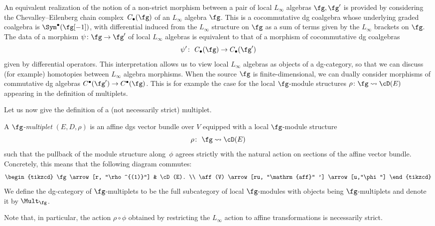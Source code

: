 \begin{rmk}
	An equivalent realization of the notion of a non-strict morphism between a pair of local $L_\infty$ algebras $\fg,\fg'$ is provided by considering the Chevalley--Eilenberg chain complex~$C_\bullet(\fg)$ of an $L_\infty$ algebra $\fg$. This is a cocommutative dg coalgebra whose underlying graded coalgebra is $\Sym^\bullet(\fg[-1])$, with differential induced from the $L_\infty$ structure on $\fg$ as a sum of terms given by the $L_\infty$ brackets on $\fg$. The data of a morphism $\psi \colon \fg \to \fg'$ of local $L_\infty$ algebras is equivalent to that of a morphism of cocommutative dg coalgebras
	\[\psi' \colon \ C_\bullet(\fg) \to C_\bullet(\fg')\]
	given by differential operators. This interpretation allows us to view local $L_\infty$ algebras as objects of a dg-category, so that we can discuss (for example) homotopies between $L_\infty$ algebra morphisms. When the source $\fg$ is finite-dimensional, we can dually consider morphisms of commutative dg algebras $C^\bullet(\fg') \to C^\bullet(\fg)$. This is for example the case for the local $\fg$-module structures $\rho \colon \fg \rightsquigarrow \cD(E)$ appearing in the definition of multiplets.
\end{rmk}

Let us now give the definition of a (not necessarily strict) multiplet.
\begin{dfn}
	A \emph{$\fg$-multiplet} $(E,D,\rho)$ is an affine dgs vector bundle over $V$ equipped with a local $\fg$-module structure
	\begin{equation*}
	\rho\colon \ \fg \rightsquigarrow \cD(E)
	\end{equation*}
	such that the pullback of the module structure along~$\phi$ agrees strictly with the natural action on sections of the affine vector bundle. Concretely, this means that the following diagram commutes:
	\begin{equation*}
	\begin{tikzcd}
	\fg \arrow[r, "\rho^{(1)}"] & \cD(E). \\
	\aff(V) \arrow[ru, "\mathrm{aff}" '] \arrow[u,"\phi"]
	\end{tikzcd}
	\end{equation*}
	We define the dg-category of $\fg$-multiplets to be the full subcategory of local $\fg$-modules with objects being $\fg$-multiplets and denote it by $\Mult_{\fg}$.
\end{dfn}

\begin{rmk}
	Note that, in particular, the action $\rho \circ \phi$ obtained by restricting the $L_\infty$ action to affine transformations is necessarily strict.
\end{rmk}

